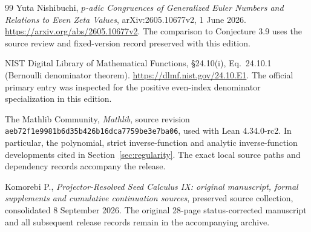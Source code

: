 \documentclass[11pt]{article}
\theoremstyle{definition}
\theoremstyle{remark}
\numberwithin{equation}{section}
\begin{document}
\clearpage




\clearpage
\begin{thebibliography}{99}
Yuta Nishibuchi,
\emph{$p$-adic Congruences of Generalized Euler Numbers and Relations to Even
Zeta Values}, arXiv:2605.10677v2, 1 June 2026.
\url{https://arxiv.org/abs/2605.10677v2}.
The comparison to Conjecture 3.9 uses the source review and fixed-version
record preserved with this edition.

NIST Digital Library of Mathematical Functions, \S24.10(i),
Eq.\ 24.10.1 (Bernoulli denominator theorem).
\url{https://dlmf.nist.gov/24.10.E1}. The official primary entry was inspected
for the positive even-index denominator specialization in this edition.

The Mathlib Community,
\emph{Mathlib}, source revision
\nolinkurl{aeb72f1e9981b6d35b426b16dca7759be3e7ba06},
used with Lean 4.34.0-rc2.
In particular, the polynomial, strict inverse-function and analytic
inverse-function developments cited in Section~\ref{sec:regularity}.
The exact local source paths and dependency records accompany the release.

Komorebi P.,
\emph{Projector-Resolved Seed Calculus IX: original manuscript, formal
supplements and cumulative continuation sources}, preserved source collection,
consolidated 8 September 2026.
The original 28-page status-corrected manuscript and all subsequent release
records remain in the accompanying archive.


\end{thebibliography}
\end{document}
